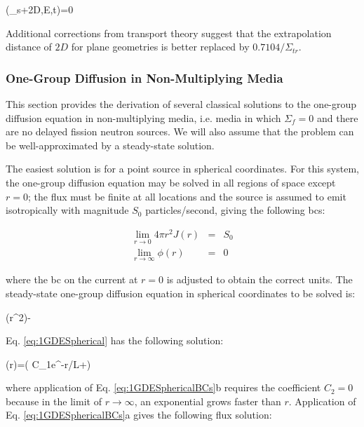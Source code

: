 \beq
\phi(_s+2D,E,t)=0
\eeq

Additional corrections from transport theory suggest that the extrapolation distance of \(2D\) for plane geometries is better replaced by \(0.7104/\Sigma_{tr}\). 

\subsubsection{One-Group Diffusion in Non-Multiplying Media}

This section provides the derivation of several classical solutions to the one-group diffusion equation in non-multiplying media, i.e. media in which \(\Sigma_f=0\) and there are no delayed fission neutron sources. We will also assume that the problem can be well-approximated by a steady-state solution. 

\label{sec:1GDEPtSrcSpherical}
The easiest solution is for a point source in spherical coordinates. For this system, the one-group diffusion equation may be solved in all regions of space except \(r=0\); the flux must be finite at all locations and the source is assumed to emit isotropically with magnitude \(S_0\) particles/second, giving the following \glspl{bc}:

\begin{subequations}
\label{eq:1GDESphericalBCs}
\begin{eqnarray}
\lim_{r\rightarrow 0}4\pi r^2J(r)&=&S_0\\
\lim_{r\rightarrow\infty}\phi(r)&=&0
\end{eqnarray}
\end{subequations}

where the \gls{bc} on the current at \(r=0\) is adjusted to obtain the correct units. The steady-state one-group diffusion equation in spherical coordinates to be solved is:

\beq
\label{eq:1GDESpherical}
\left(r^2\right)-
\eeq

Eq. \eqref{eq:1GDESpherical} has the following solution:

\beq
\phi(r)=\left( C_1e^{-r/L}+\right)
\eeq

where application of Eq. \eqref{eq:1GDESphericalBCs}b requires the coefficient \(C_2=0\) because in the limit of \(r\rightarrow\infty\), an exponential grows faster than \(r\). Application of Eq. \eqref{eq:1GDESphericalBCs}a gives the following flux solution:

